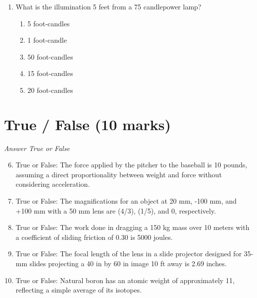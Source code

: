 \documentclass[12pt]{article}
\begin{document}
\begin{enumerate}[label=\arabic*.]
\begin{enumerate}[label=(\alph*)]
    \item 2.65 e-07
    \item 7.10 e-07
    \item 2.30 e-07
    \item 8.45 e-07
    \item 5.67 e-07
\end{enumerate}
\item What is the illumination 5 feet from a 75 candlepower lamp?
\begin{enumerate}[label=(\alph*)]
    \item 5 foot-candles
    \item 1 foot-candle
    \item 50 foot-candles
    \item 15 foot-candles
    \item 20 foot-candles
\end{enumerate}
\end{enumerate}

\section*{True / False (10 marks)}
\textit{Answer True or False}
\begin{enumerate}[label=\arabic*.]
\setcounter{enumi}{5}
\item True or False: The force applied by the pitcher to the baseball is 10 pounds, assuming a direct proportionality between weight and force without considering acceleration.
\item True or False: The magnifications for an object at 20 mm, -100 mm, and +100 mm with a 50 mm lens are (4/3), (1/5), and 0, respectively.
\item True or False: The work done in dragging a 150 kg mass over 10 meters with a coefficient of sliding friction of 0.30 is 5000 joules.
\item True or False: The focal length of the lens in a slide projector designed for 35-mm slides projecting a 40 in by 60 in image 10 ft away is 2.69 inches.
\item True or False: Natural boron has an atomic weight of approximately 11, reflecting a simple average of its isotopes.
\end{enumerate}
\end{document}
